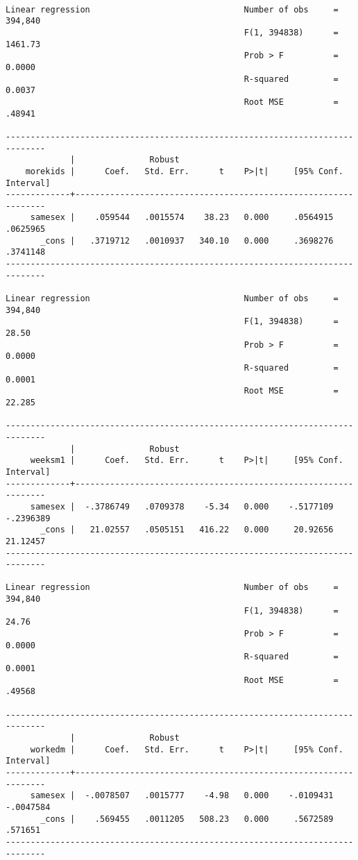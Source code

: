 \documentclass[11pt]{article}
\begin{document}
\begin{verbatim}

Linear regression                               Number of obs     =    394,840
                                                F(1, 394838)      =    1461.73
                                                Prob > F          =     0.0000
                                                R-squared         =     0.0037
                                                Root MSE          =     .48941

------------------------------------------------------------------------------
             |               Robust
    morekids |      Coef.   Std. Err.      t    P>|t|     [95% Conf. Interval]
-------------+----------------------------------------------------------------
     samesex |    .059544   .0015574    38.23   0.000     .0564915    .0625965
       _cons |   .3719712   .0010937   340.10   0.000     .3698276    .3741148
------------------------------------------------------------------------------

Linear regression                               Number of obs     =    394,840
                                                F(1, 394838)      =      28.50
                                                Prob > F          =     0.0000
                                                R-squared         =     0.0001
                                                Root MSE          =     22.285

------------------------------------------------------------------------------
             |               Robust
     weeksm1 |      Coef.   Std. Err.      t    P>|t|     [95% Conf. Interval]
-------------+----------------------------------------------------------------
     samesex |  -.3786749   .0709378    -5.34   0.000    -.5177109   -.2396389
       _cons |   21.02557   .0505151   416.22   0.000     20.92656    21.12457
------------------------------------------------------------------------------

Linear regression                               Number of obs     =    394,840
                                                F(1, 394838)      =      24.76
                                                Prob > F          =     0.0000
                                                R-squared         =     0.0001
                                                Root MSE          =     .49568

------------------------------------------------------------------------------
             |               Robust
     workedm |      Coef.   Std. Err.      t    P>|t|     [95% Conf. Interval]
-------------+----------------------------------------------------------------
     samesex |  -.0078507   .0015777    -4.98   0.000    -.0109431   -.0047584
       _cons |    .569455   .0011205   508.23   0.000     .5672589     .571651
------------------------------------------------------------------------------
\end{verbatim}
\end{document}
